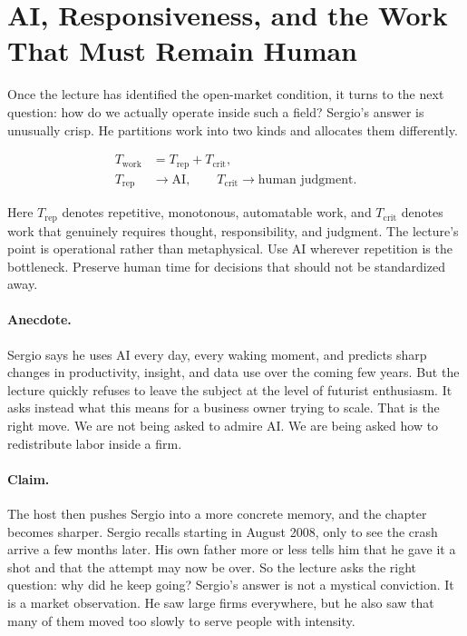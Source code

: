 \section{AI, Responsiveness, and the Work That Must Remain Human}

Once the lecture has identified the open-market condition, it turns to the next question: how do we actually operate inside such a field? Sergio's answer is unusually crisp. He partitions work into two kinds and allocates them differently.

\begin{align}
T_{\mathrm{work}} &= T_{\mathrm{rep}} + T_{\mathrm{crit}},\\
T_{\mathrm{rep}} &\to \mathrm{AI}, \qquad
T_{\mathrm{crit}} \to \text{human judgment}.
\end{align}

Here \(T_{\mathrm{rep}}\) denotes repetitive, monotonous, automatable work, and \(T_{\mathrm{crit}}\) denotes work that genuinely requires thought, responsibility, and judgment. The lecture's point is operational rather than metaphysical. Use AI wherever repetition is the bottleneck. Preserve human time for decisions that should not be standardized away.

\paragraph{Anecdote.}
Sergio says he uses AI every day, every waking moment, and predicts sharp changes in productivity, insight, and data use over the coming few years. But the lecture quickly refuses to leave the subject at the level of futurist enthusiasm. It asks instead what this means for a business owner trying to scale. That is the right move. We are not being asked to admire AI. We are being asked how to redistribute labor inside a firm.

\paragraph{Claim.}
The host then pushes Sergio into a more concrete memory, and the chapter becomes sharper. Sergio recalls starting in August 2008, only to see the crash arrive a few months later. His own father more or less tells him that he gave it a shot and that the attempt may now be over. So the lecture asks the right question: why did he keep going? Sergio's answer is not a mystical conviction. It is a market observation. He saw large firms everywhere, but he also saw that many of them moved too slowly to serve people with intensity.

